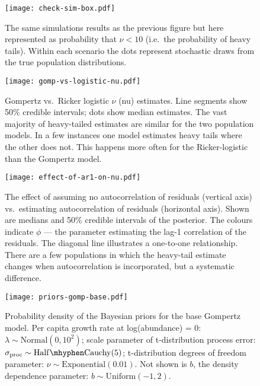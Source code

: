 \documentclass[11pt]{article}
\begin{document}
\begin{figure}[htbp]
\begin{center}
\texttt{[image: check-sim-box.pdf]}
\caption{The same simulations results as the previous figure but here represented as probability that $\nu < 10$ (i.e.\ the probability of heavy tails). Within each scenario the dots represent stochastic draws from the true population distributions.}
\label{fig:sim-prob}
\end{center}
\end{figure}

\clearpage

\begin{figure}[htbp]
\begin{center}
\texttt{[image: gomp-vs-logistic-nu.pdf]}
\caption{Gompertz vs.\ Ricker logistic $\nu$ (nu) estimates. Line segments show 50\% credible intervals; dots show median estimates. The vast majority of heavy-tailed estimates are similar for the two population models. In a few instances one model estimates heavy tails where the other does not. This happens more often for the Ricker-logistic than the Gompertz model.}
\label{fig:gomp-vs-ricker}
\end{center}
\end{figure}

\begin{figure}[htbp]
\begin{center}
\texttt{[image: effect-of-ar1-on-nu.pdf]}
\caption{The effect of assuming no autocorrelation of residuals (vertical axis) vs.\ estimating autocorrelation of residuals (horizontal axis). Shown are medians and 50\% credible intervals of the posterior. The colours indicate $\phi$ --- the parameter estimating the lag-1 correlation of the residuals. The diagonal line illustrates a one-to-one relationship. There are a few populations in which the heavy-tail estimate changes when autocorrelation is incorporated, but a systematic difference.}
\label{fig:ar1}
\end{center}
\end{figure}

\clearpage

\begin{figure}[htbp]
\begin{center}
\texttt{[image: priors-gomp-base.pdf]} \caption{Probability
  density of the Bayesian priors for the base Gompertz model. Per capita growth
  rate at log(abundance) = 0: $\lambda \sim \mathrm{Normal}(0, 10^2)$; scale
  parameter of t-distribution process error: $\sigma_\mathrm{proc} \sim \mathrm{Half\mhyphen
    Cauchy} (5)$; t-distribution degrees of freedom parameter: $\nu \sim
  \mathrm{Exponential}(0.01)$. Not shown is $b$, the density dependence
  parameter: $b \sim \mathrm{Uniform}(-1, 2)$.}
  \label{fig:priors}
\end{center}
\end{figure}
\end{document}
